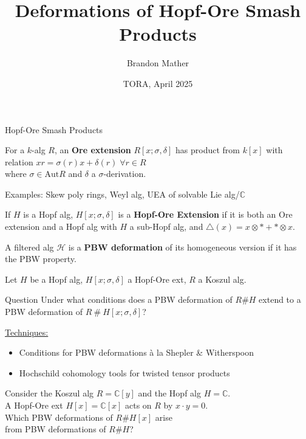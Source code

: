 \documentclass{beamer}
\title{Deformations of Hopf-Ore Smash Products}
\author{Brandon Mather}
\date{TORA, April 2025}
\begin{document}
\maketitle

\begin{frame}{Hopf-Ore Smash Products}
\begin{definition}
    For a \(k\)-alg \(R\), an \textbf{Ore extension} \(R[x;\sigma,\delta]\) has product from \(k[x]\) with relation \(xr=\sigma(r)x+\delta(r)\;\forall r\in R\) \\where \(\sigma\in \text{Aut}R\) and \(\delta\) a \(\sigma\)-derivation. 
\end{definition}
Examples: Skew poly rings, Weyl alg, UEA of solvable Lie alg/\(\mathbb{C}\)
\begin{definition}
    If \(H\) is a Hopf alg, \(H[x;\sigma,\delta]\) is a \textbf{Hopf-Ore Extension} if it is both an Ore extension and a Hopf alg with \(H\) a sub-Hopf alg, and \(\triangle(x)=x\otimes *+*\otimes x\).
\end{definition}
\begin{definition}
    A filtered alg \(\mathcal{H}\) is a \textbf{PBW deformation} of its homogeneous version if it has the PBW property.
\end{definition}
\end{frame}

\begin{frame} 
    Let \(H\) be a Hopf alg, \(H[x;\sigma,\delta]\) a Hopf-Ore ext, \(R\) a Koszul alg.
\begin{beamerboxesrounded}{Question}
    Under what conditions does a PBW deformation of \(R\#H\) extend to a PBW deformation of \(R\ \#\ H[x;\sigma,\delta]\)?
\end{beamerboxesrounded}

\underline{Techniques:}
\begin{itemize}
    \item Conditions for PBW deformations \`a la Shepler \& Witherspoon
    \item Hochschild cohomology tools for twisted tensor products
\end{itemize}
\begin{example}
    Consider the Koszul alg \(R=\mathbb{C}[y]\) and the Hopf alg \(H=\mathbb{C}\).
    \\A Hopf-Ore ext \(H[x]=\mathbb{C}[x]\) acts on \(R\) by \(x\cdot y=0\).
    \\Which PBW deformations of \(R\#H[x]\) arise \\\hspace{1.5ex}from PBW deformations of \(R\#H\)?
\end{example}
\end{frame}
\end{document}

